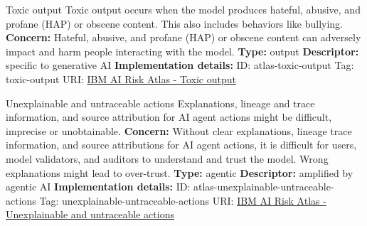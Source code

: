 \documentclass[a4paper,12pt]{article}
\begin{document}
\begin{definitionbox}{Toxic output}
Toxic output occurs when the model produces hateful, abusive, and profane (HAP) or obscene content. This also includes behaviors like bullying.\newline\newline
\textbf{Concern: }Hateful, abusive, and profane (HAP) or obscene content can adversely impact and harm people interacting with the model.\newline\newline
\textbf{Type: }output\newline
\textbf{Descriptor: }specific to generative AI \newline\newline
\textbf{Implementation details: } \newline
ID: atlas-toxic-output \newline
Tag: toxic-output \newline
URI:  \href{https://www.ibm.com/docs/en/watsonx/saas?topic=SSYOK8/wsj/ai-risk-atlas/toxic-output.html}{IBM AI Risk Atlas - Toxic output}\newline
\end{definitionbox}
\begin{definitionbox}{Unexplainable and untraceable actions}
Explanations, lineage and trace information, and source attribution for AI agent actions might be difficult, imprecise or unobtainable. \newline\newline
\textbf{Concern: }Without clear explanations, lineage trace information, and source attributions for AI agent actions, it is difficult for users, model validators, and auditors to understand and trust the model. Wrong explanations might lead to over-trust.\newline\newline
\textbf{Type: }agentic\newline
\textbf{Descriptor: }amplified by agentic AI \newline\newline
\textbf{Implementation details: } \newline
ID: atlas-unexplainable-untraceable-actions \newline
Tag: unexplainable-untraceable-actions \newline
URI:  \href{https://www.ibm.com/docs/en/watsonx/saas?topic=SSYOK8/wsj/ai-risk-atlas/unexplainable-untraceable-actions.html}{IBM AI Risk Atlas - Unexplainable and untraceable actions}\newline
\end{definitionbox}
\end{document}
